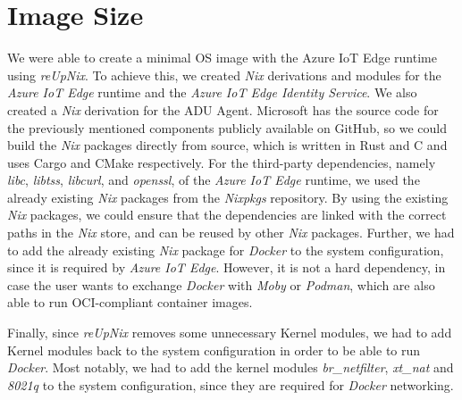 
\section{Image Size}
We were able to create a minimal \ac{OS} image with the Azure IoT Edge runtime
using \textit{reUpNix}. To achieve this, we created \textit{Nix} derivations
and modules for the \textit{Azure IoT Edge} runtime and the \textit{Azure IoT Edge
Identity Service}. We also created a \textit{Nix} derivation for the \ac{ADU} Agent.
Microsoft has the source code for the previously mentioned components
publicly available on GitHub, so we could build the \textit{Nix} packages directly
from source, which is written in Rust and C and uses Cargo and CMake respectively.
For the third-party dependencies, namely \textit{libc}, \textit{libtss}, \textit{libcurl}, and
\textit{openssl}, of the \textit{Azure IoT Edge} runtime, we used
the already existing \textit{Nix} packages from the \textit{Nixpkgs} repository.
By using the existing \textit{Nix} packages, we could ensure that the dependencies
are linked with the correct paths in the \textit{Nix} store, and can be reused
by other \textit{Nix} packages.
Further, we had to add the already existing \textit{Nix} package for \textit{Docker}
to the system configuration, since it is required by \textit{Azure IoT Edge}.
However, it is not a hard dependency, in case the user wants to exchange \textit{Docker}
with \textit{Moby} or \textit{Podman}, which are also able to run \ac{OCI}-compliant
container images.

Finally, since \textit{reUpNix} removes some unnecessary
Kernel modules, we had to add Kernel modules back to the system configuration in order
to be able to run \textit{Docker}.
Most notably, we had to add the kernel modules
\textit{br\_netfilter}, \textit{xt\_nat} and \textit{8021q} to the system configuration,
since they are required for \textit{Docker} networking.


